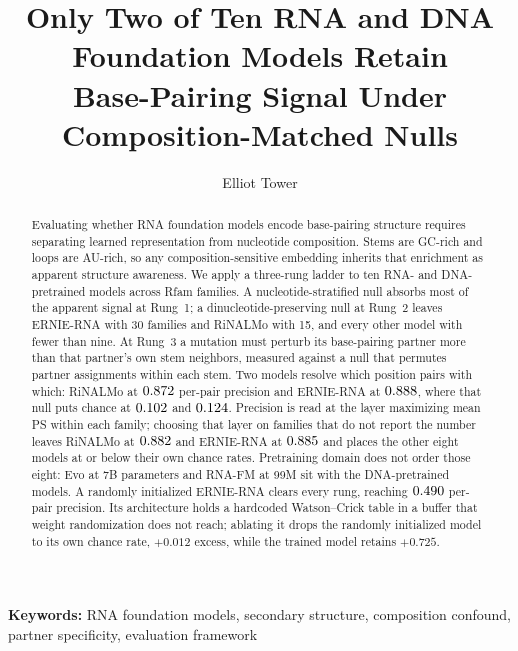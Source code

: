 \documentclass[11pt]{article}
\title{Only Two of Ten RNA and DNA Foundation Models Retain\\Base-Pairing Signal Under Composition-Matched Nulls}
\author{Elliot Tower}
\affil{Independent researcher \\ \texttt{elliot@elliottower.ai}}
\date{}
\begin{document}
\maketitle

\noindent\textbf{Keywords:} RNA foundation models, secondary structure, composition confound, partner specificity, evaluation framework

\begin{abstract}
Evaluating whether RNA foundation models encode base-pairing structure requires
separating learned representation from nucleotide composition. Stems are GC-rich
and loops are AU-rich, so any composition-sensitive embedding inherits that
enrichment as apparent structure awareness. We apply a three-rung ladder to ten
RNA- and DNA-pretrained models across \panelN{} Rfam families. A
nucleotide-stratified null absorbs most of the apparent signal at Rung~1; a
dinucleotide-preserving null at Rung~2 leaves ERNIE-RNA with 30 families and
RiNALMo with 15, and every other model with fewer than nine. At Rung~3 a
mutation must perturb its base-pairing partner more than that partner's own stem
neighbors, measured against a null that permutes partner assignments within
each stem. Two models resolve which position pairs with which: RiNALMo at
$0.872{}$ per-pair precision and ERNIE-RNA at
$0.888{}$, where that null puts chance at
$0.102{}$ and $0.124{}$. Precision is read at the
layer maximizing mean PS within each family; choosing that layer on families
that do not report the number leaves RiNALMo at $0.882{}$ and
ERNIE-RNA at $0.885{}$ and places the other eight models at or
below their own chance rates. Pretraining domain does not order
those eight: Evo at 7B parameters and RNA-FM at 99M sit with the
DNA-pretrained models.
A randomly initialized ERNIE-RNA clears every rung, reaching
$0.490{}$ per-pair precision. Its architecture holds a hardcoded Watson--Crick table in a buffer
that weight randomization does not reach; ablating it drops the randomly
initialized model to its own chance rate, $+0.012$ excess, while the trained
model retains $+0.725$.
\end{abstract}
\end{document}
